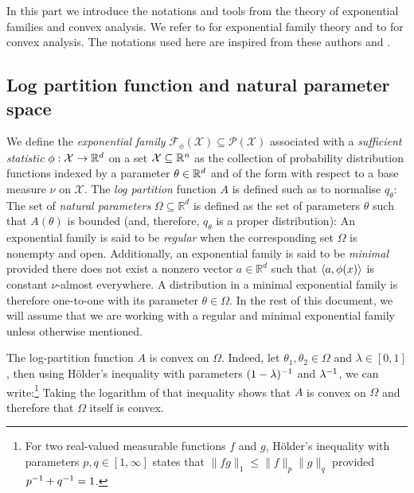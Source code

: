 
In this part we introduce the notations and tools from the theory of exponential families and convex analysis. We refer to \citet{brown86} for exponential family theory and to \citet{rockafellar70} for convex analysis. The notations used here are inspired from these authors and \citet{wainwright08}.

\subsection{Log partition function and natural parameter space
}

We define the \emph{exponential family} $\mathcal F_\phi(\mathcal X)\subseteq\mathcal P(\mathcal X)$ associated with a \emph{sufficient statistic} $\phi:\mathcal X\to\mathbb R^{d}$ on a set $\mathcal X\subseteq \mathbb R^{n}$ as the collection of probability distribution functions indexed by a parameter $\theta\in\mathbb R^{d}$ and of the form
%
%
with respect to a base measure $\nu$ on $\mathcal X$. The \emph{log partition} function $A$ is defined such as to normalise $q_{\theta}$:
%
%
The set of \emph{natural parameters} $\Omega \subseteq \mathbb R^{d}$ is defined as the set of parameters $\theta$ such that $A(\theta)$ is bounded (and, therefore, $q_\theta$ is a proper distribution):
%
An exponential family is said to be \emph{regular} when the corresponding set $\Omega$ is nonempty and open. Additionally, an exponential family is said to be \emph{minimal} provided there does not exist a nonzero vector $a\in\mathbb R^{d}$ such that $\left\langle a,\phi(x) \right\rangle$ is constant $\nu$-almost everywhere. A distribution in a minimal exponential family is therefore one-to-one with its parameter $\theta\in\Omega$. In the rest of this document, we will assume that we are working with a regular and minimal exponential family unless otherwise mentioned.

The log-partition function $A$ is convex on $\Omega$. Indeed, let $\theta_1,\theta_2\in\Omega$ and $\lambda\in[0,1]$, then using H\"older's inequality with parameters $(1-\lambda)^{-1}$ and $\lambda^{-1}$, we can write:\footnote{For two real-valued measurable functions $f$ and $g$, H\"older's inequality with parameters $p,q\in[1,\infty]$ states that $\|fg\|_{1}\le \|f\|_{p}\|g\|_{q}$ provided $p^{-1}+q^{-1}=1$.}
Taking the logarithm of that inequality shows that $A$ is convex on $\Omega$ and therefore that $\Omega$ itself is convex.
%
